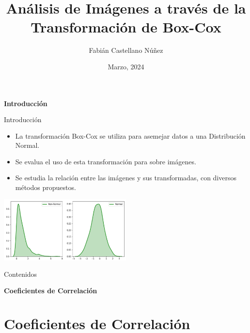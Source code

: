 \documentclass{beamer}
\title[Defensa de Memoria]{\bf An\'alisis de Im\'agenes a trav\'es de la Transformaci\'on de Box-Cox}
\author{Fabián Castellano Núñez}
\institute[Universidad Técnica Federico Santa María]
  {
  Profesor Guia: Ronny Vallejos A.
  }
\date{Marzo,  2024}
\begin{document}
\begin{frame}
  \titlepage
\end{frame}
\begin{frame}
    \begin{center}
        {\LARGE\bf Introducción}
    \end{center}
\end{frame}

\begin{frame}{Introducción}
    \begin{itemize}
        \item La transformación Box-Cox se utiliza para asemejar datos a una Distribución Normal.
        \item Se evalua el uso de esta transformación para sobre im\'agenes.
        \item Se estudia la relación entre las im\'agenes y sus transformadas, con diversos m\'etodos propuestos.
    \end{itemize}
    \includegraphics[width=0.5\textwidth]{output275.png}
\end{frame}


\begin{frame}{Contenidos}
  \tableofcontents
\end{frame}

\begin{frame}
    \begin{center}
        {\LARGE\bf Coeficientes de Correlación}
    \end{center}
\end{frame}

\section{Coeficientes de Correlación}
\end{document}
